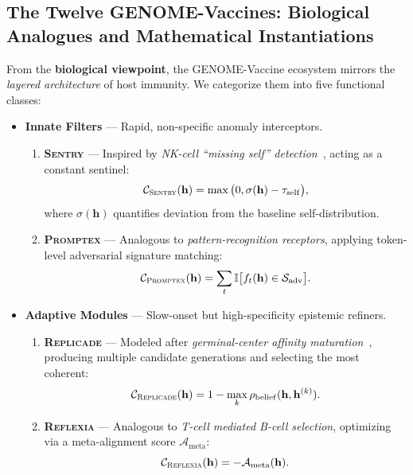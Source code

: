 \subsection*{The Twelve GENOME-Vaccines: Biological Analogues and Mathematical Instantiations}

From the \textbf{biological viewpoint}, the GENOME-Vaccine ecosystem mirrors the \emph{layered architecture} of host immunity. We categorize them into five functional classes:

\begin{itemize}
    \item \textbf{Innate Filters} — Rapid, non-specific anomaly interceptors.
    \begin{enumerate}
        \item \textbf{\textsc{Sentry}} — Inspired by \emph{NK-cell ``missing self'' detection}~\cite{vivier2011innate}, acting as a constant sentinel:
        \[
        \mathcal{C}_{\textsc{Sentry}}(\mathbf{h}) = \max\big(0, \sigma(\mathbf{h}) - \tau_\mathrm{self}\big),
        \]
        where $\sigma(\mathbf{h})$ quantifies deviation from the baseline self-distribution.

        \item \textbf{\textsc{Promptex}} — Analogous to \emph{pattern-recognition receptors}, applying token-level adversarial signature matching:
        \[
        \mathcal{C}_{\textsc{Promptex}}(\mathbf{h}) = \sum_{t} \mathbb{I}\big[f_t(\mathbf{h}) \in \mathcal{S}_\mathrm{adv}\big].
        \]
    \end{enumerate}

    \item \textbf{Adaptive Modules} — Slow-onset but high-specificity epistemic refiners.
    \begin{enumerate}
        \item \textbf{\textsc{Replicade}} — Modeled after \emph{germinal-center affinity maturation}~\cite{kelsoe1996life}, producing multiple candidate generations and selecting the most coherent:
        \[
        \mathcal{C}_{\textsc{Replicade}}(\mathbf{h}) = 1 - \max_{k} \rho_\mathrm{belief}(\mathbf{h}, \mathbf{h}^{(k)}).
        \]
        
        \item \textbf{\textsc{Reflexia}} — Analogous to \emph{T-cell mediated B-cell selection}, optimizing via a meta-alignment score $\mathcal{A}_\mathrm{meta}$:
        \[
        \mathcal{C}_{\textsc{Reflexia}}(\mathbf{h}) = -\mathcal{A}_\mathrm{meta}(\mathbf{h}).
        \]
    \end{enumerate}


\end{itemize}
